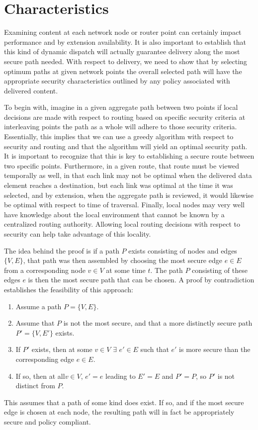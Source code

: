 \section{Characteristics}
\label{section:characteristics}
Examining content at each network node or router point can certainly impact performance and by extension availability.  It is also important to establish that this kind of dynamic dispatch will actually guarantee delivery along the most secure path needed.  With respect to delivery, we need to show that by selecting optimum paths at given network points the overall selected path will have the appropriate security characteristics outlined by any policy associated with delivered content.

To begin with, imagine in a given aggregate path between two points if local decisions are made with respect to routing based on specific security criteria at interleaving points the path as a whole will adhere to those security criteria.  Essentially, this implies that we can use a greedy algorithm with respect to security and routing and that the algorithm will yield an optimal security path.  It is important to recognize that this is key to establishing a secure route between two specific points.  Furthermore, in a given route, that route must be viewed temporally as well, in that each link may not be optimal when the delivered data element reaches a destination, but each link was optimal at the time it was selected, and by extension, when the aggregate path is reviewed, it would likewise be optimal with respect to time of traversal.  Finally, local nodes may very well have knowledge about the local environment that cannot be known by a centralized routing authority.  Allowing local routing decisions with respect to security can help take advantage of this locality.

The idea behind the proof is if a path $P$ exists consisting of nodes and edges $\lbrace V, E \rbrace$, that path was then assembled by choosing the most secure edge $e \in E$ from a corresponding node $v \in V$ at some time $t$.  The path $P$ consisting of these edges $e$ is then the most secure path that can be chosen.  A proof by contradiction establishes the feasibility of this approach:

\begin{enumerate}
\item Assume a path $P = \lbrace V, E \rbrace$.
\item Assume that $P$ is not the most secure, and that a more distinctly secure path $P' = \lbrace V, E' \rbrace$ exists.
\item If $P'$ exists, then at some $v \in V$ $\exists$ $e' \in E$ such that $e'$ is more secure than the corresponding edge $e \in E$.
\item If so, then at all$v \in V$, $e' = e$ leading to $E' = E$ and $P' = P$, so $P'$ is not distinct from $P$. 
\end{enumerate}

This assumes that a path of some kind does exist.  If so, and if the most secure edge is chosen at each node, the resulting path will in fact be appropriately secure and policy compliant.